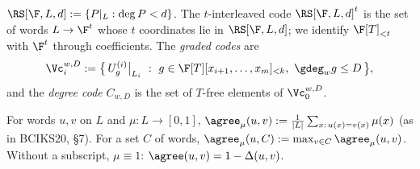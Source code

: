 \begin{definition}[Codes]\label{def:codes}
$\RS[\F,L,d]:=\{P|_L:\deg P<d\}$. The $t$-interleaved code $\RS[\F,L,d]^t$ is the set
of words $L\to\F^t$ whose $t$ coordinates lie in $\RS[\F,L,d]$; we identify
$\F[T]_{<t}$ with $\F^t$ through coefficients. The \emph{graded codes} are
\[
\Vc_i^{w,D}:=\big\{\,U^{(i)}_g\big|_{L_i}\ :\ g\in\F[T][x_{i+1},\dots,x_m]_{<k},\ \gdeg_w g\le D\,\big\},
\]
and the \emph{degree code} $C_{w,D}$ is the set of $T$-free elements of $\Vc_0^{w,D}$.
\end{definition}

\begin{definition}\label{def:agree}
For words $u,v$ on $L$ and $\mu:L\to[0,1]$,
$\agree_\mu(u,v):=\frac1{|L|}\sum_{x:\,u(x)=v(x)}\mu(x)$ (as in BCIKS20, \S7). For a set
$C$ of words, $\agree_\mu(u,C):=\max_{v\in C}\agree_\mu(u,v)$. Without a subscript,
$\mu\equiv1$: $\agree(u,v)=1-\Delta(u,v)$.
\end{definition}
